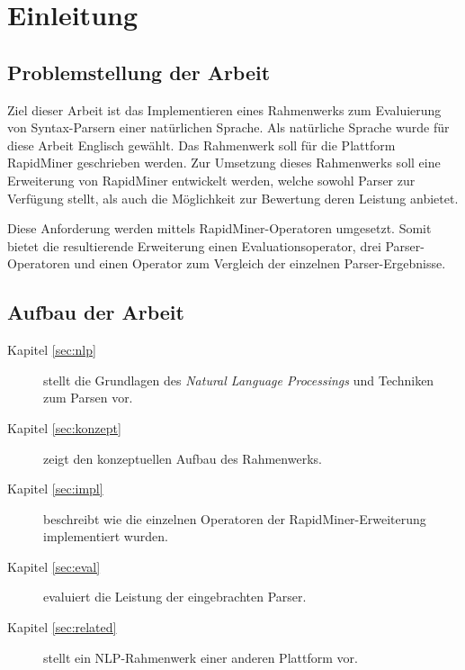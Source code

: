 %
\chapter{Einleitung}
\label{sec:intro}


\section{Problemstellung der Arbeit}

Ziel dieser Arbeit ist das Implementieren eines Rahmenwerks zum Evaluierung von Syntax-Parsern einer natürlichen Sprache. Als natürliche Sprache wurde für diese Arbeit Englisch gewählt. Das Rahmenwerk soll für die Plattform RapidMiner \cite{rmstudio} geschrieben werden. Zur Umsetzung dieses Rahmenwerks soll eine Erweiterung von RapidMiner entwickelt werden, welche sowohl Parser zur Verfügung stellt, als auch die Möglichkeit zur Bewertung deren Leistung anbietet. 

Diese Anforderung werden mittels RapidMiner-Operatoren umgesetzt. Somit bietet die resultierende Erweiterung einen Evaluationsoperator, drei Parser-Operatoren und einen Operator zum Vergleich der einzelnen Parser-Ergebnisse.

\section{Aufbau der Arbeit}
\begin{description}
\item[Kapitel \ref{sec:nlp}] stellt die Grundlagen des \textit{Natural Language Processings} und Techniken zum Parsen vor.
\item[Kapitel \ref{sec:konzept}] zeigt den konzeptuellen Aufbau des Rahmenwerks.
\item[Kapitel \ref{sec:impl}] beschreibt wie die einzelnen Operatoren der RapidMiner-Erweiterung implementiert wurden.
\item[Kapitel \ref{sec:eval}] evaluiert die Leistung der eingebrachten Parser.
\item[Kapitel \ref{sec:related}] stellt ein NLP-Rahmenwerk einer anderen Plattform vor.
\end{description}
